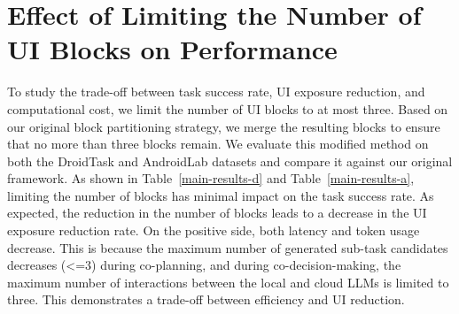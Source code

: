 \section{Effect of Limiting the Number of UI Blocks on Performance}
To study the trade-off between task success rate, UI exposure reduction, and computational cost, we limit the number of UI blocks to at most three. Based on our original block partitioning strategy, we merge the resulting blocks to ensure that no more than three blocks remain. We evaluate this modified method on both the DroidTask \citep{wen2024autodroid} and AndroidLab \citep{xu2024androidlab} datasets and compare it against our original framework. As shown in Table~\ref{main-results-d} and Table~\ref{main-results-a}, limiting the number of blocks has minimal impact on the task success rate. As expected, the reduction in the number of blocks leads to a decrease in the UI exposure reduction rate. On the positive side, both latency and token usage decrease. This is because the maximum number of generated sub-task candidates decreases (<=3) during co-planning, and during co-decision-making, the maximum number of interactions between the local and cloud LLMs is limited to three. This demonstrates a trade-off between efficiency and UI reduction.

